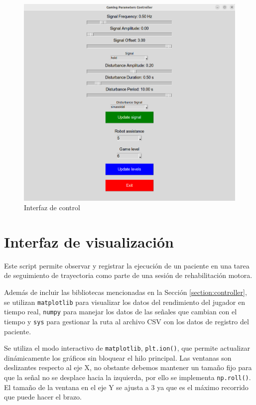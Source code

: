 \begin{figure}[ht!]
	\centering
	\begin{minipage}{0.85\linewidth}
		\centering
		\includegraphics[width=\linewidth]{figs/control_pannel.png}
	\end{minipage}
	\caption[Interfaz de control]{Interfaz de control}
	\label{fig:control}
\end{figure}

\section{Interfaz de visualización}
\label{section:visualization}

Este script permite observar y registrar la ejecución de un paciente en una tarea de seguimiento de trayectoria como parte de una sesión de rehabilitación motora.

Además de incluir las bibliotecas mencionadas en la Sección \ref{section:controller}, se utilizan \verb|matplotlib| para visualizar los datos del rendimiento del jugador en tiempo real, \verb|numpy| para manejar los datos de las señales que cambian con el tiempo y \verb|sys| para gestionar la ruta al archivo CSV con los datos de registro del paciente.

Se utiliza el modo interactivo de \verb|matplotlib|, \verb|plt.ion()|, que permite actualizar dinámicamente los gráficos sin bloquear el hilo principal.
Las ventanas son deslizantes respecto al eje X, no obstante debemos mantener un tamaño fijo para que la señal no se desplace hacia la izquierda, por ello se implementa \verb|np.roll()|.
El tamaño de la ventana en el eje Y se ajusta a $3$ ya que es el máximo recorrido que puede hacer el brazo.

